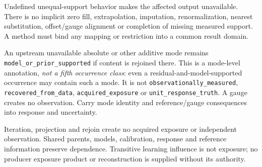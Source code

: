 {{Undefined unequal-support behavior makes the affected output unavailable.
There is no implicit zero fill, extrapolation, imputation, renormalization,
nearest substitution, offset/gauge alignment or completion of missing measured
support. A method must bind any mapping or restriction into a common result domain.

An upstream unavailable absolute or other additive mode remains
\texttt{model\_or\_prior\_supported} if content is rejoined there. This is a
mode-level annotation, \emph{not a fifth occurrence class}: even a
residual-and-model-supported occurrence may contain such a mode. It is not
\texttt{observationally\_measured}, \texttt{recovered\_from\_data},
\texttt{acquired\_exposure} or \texttt{unit\_response\_truth}.
A gauge creates no observation. Carry mode identity and reference/gauge
consequences into response and uncertainty.

Iteration, projection and rejoin create no acquired exposure or independent
observation. Shared parents, models, calibration, response and reference
information preserve dependence. Transitive learning influence is not exposure;
no producer exposure product or reconstruction is supplied without its authority.
}}
